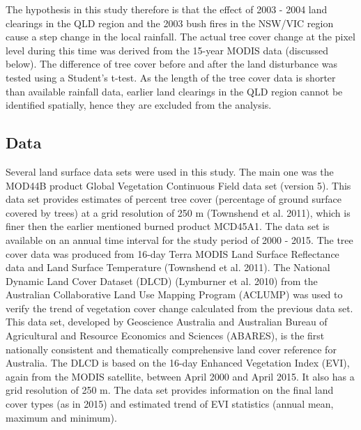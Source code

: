 \documentclass[]{elsarticle} %
\theoremstyle{definition}
\theoremstyle{definition}
\theoremstyle{definition}
\theoremstyle{remark}
\begin{document}
The hypothesis in this study therefore is that the effect of 2003 - 2004
land clearings in the QLD region and the 2003 bush fires in the NSW/VIC
region cause a step change in the local rainfall. The actual tree cover
change at the pixel level during this time was derived from the 15-year
MODIS data (discussed below). The difference of tree cover before and
after the land disturbance was tested using a Student's t-test. As the
length of the tree cover data is shorter than available rainfall data,
earlier land clearings in the QLD region cannot be identified spatially,
hence they are excluded from the analysis.

\hypertarget{Data}{\subsection{Data}\label{Data}}

Several land surface data sets were used in this study. The main one was
the MOD44B product Global Vegetation Continuous Field data set (version
5). This data set provides estimates of percent tree cover (percentage
of ground surface covered by trees) at a grid resolution of 250 m
(Townshend et al. 2011), which is finer then the earlier mentioned
burned product MCD45A1. The data set is available on an annual time
interval for the study period of 2000 - 2015. The tree cover data was
produced from 16-day Terra MODIS Land Surface Reflectance data and Land
Surface Temperature (Townshend et al. 2011). The National Dynamic Land
Cover Dataset (DLCD) (Lymburner et al. 2010) from the Australian
Collaborative Land Use Mapping Program (ACLUMP) was used to verify the
trend of vegetation cover change calculated from the previous data set.
This data set, developed by Geoscience Australia and Australian Bureau
of Agricultural and Resource Economics and Sciences (ABARES), is the
first nationally consistent and thematically comprehensive land cover
reference for Australia. The DLCD is based on the 16-day Enhanced
Vegetation Index (EVI), again from the MODIS satellite, between April
2000 and April 2015. It also has a grid resolution of 250 m. The data
set provides information on the final land cover types (as in 2015) and
estimated trend of EVI statistics (annual mean, maximum and minimum).
\end{document}
